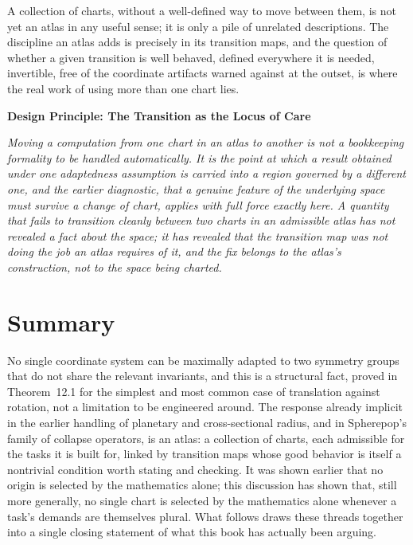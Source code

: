\documentclass[11pt,fleqn]{book}
\numberwithin{equation}{chapter}
\newenvironment{principle}[1]
  {\begin{principleEnv}
   \noindent\textbf{Design Principle: #1}\par\smallskip\itshape}
  {\end{principleEnv}}
\theoremstyle{plain}
\theoremstyle{definition}
\theoremstyle{remark}
\begin{document}
A collection of charts, without a well-defined way to move between them, is not yet an atlas in any useful sense; it is only a pile of unrelated descriptions. The discipline an atlas adds is precisely in its transition maps, and the question of whether a given transition is well behaved, defined everywhere it is needed, invertible, free of the coordinate artifacts warned against at the outset, is where the real work of using more than one chart lies.

\begin{principle}{The Transition as the Locus of Care}
Moving a computation from one chart in an atlas to another is not a bookkeeping formality to be handled automatically. It is the point at which a result obtained under one adaptedness assumption is carried into a region governed by a different one, and the earlier diagnostic, that a genuine feature of the underlying space must survive a change of chart, applies with full force exactly here. A quantity that fails to transition cleanly between two charts in an admissible atlas has not revealed a fact about the space; it has revealed that the transition map was not doing the job an atlas requires of it, and the fix belongs to the atlas's construction, not to the space being charted.
\end{principle}

\section{Summary}

No single coordinate system can be maximally adapted to two symmetry groups that do not share the relevant invariants, and this is a structural fact, proved in Theorem~12.1 for the simplest and most common case of translation against rotation, not a limitation to be engineered around. The response already implicit in the earlier handling of planetary and cross-sectional radius, and in Spherepop's family of collapse operators, is an atlas: a collection of charts, each admissible for the tasks it is built for, linked by transition maps whose good behavior is itself a nontrivial condition worth stating and checking. It was shown earlier that no origin is selected by the mathematics alone; this discussion has shown that, still more generally, no single chart is selected by the mathematics alone whenever a task's demands are themselves plural. What follows draws these threads together into a single closing statement of what this book has actually been arguing.
\end{document}
